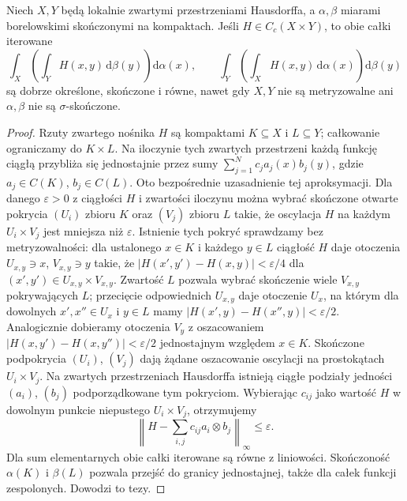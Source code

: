 \begin{lemat}
\label{lem:haar-fubini-compact-23}
Niech $X,Y$ będą lokalnie zwartymi przestrzeniami Hausdorffa,
a $\alpha,\beta$ miarami borelowskimi skończonymi na
kompaktach. Jeśli $H\in C_c(X\times Y)$, to obie całki iterowane
\[
 \int_X\!\left(\int_Y H(x,y)\,\mathrm d\beta(y)\right)
 \mathrm d\alpha(x),\qquad
 \int_Y\!\left(\int_X H(x,y)\,\mathrm d\alpha(x)\right)
 \mathrm d\beta(y)
\]
są dobrze określone, skończone i równe, nawet gdy
$X,Y$ nie są metryzowalne ani $\alpha,\beta$
nie są $\sigma$-skończone.
\end{lemat}
\begin{proof}
Rzuty zwartego nośnika $H$ są kompaktami $K\subseteq X$
i $L\subseteq Y$; całkowanie ograniczamy do $K\times L$.
Na iloczynie tych zwartych przestrzeni każdą funkcję
ciągłą przybliża się jednostajnie przez sumy
$\sum_{j=1}^Nc_j a_j(x)b_j(y)$, gdzie
$a_j\in C(K)$, $b_j\in C(L)$. Oto bezpośrednie
uzasadnienie tej aproksymacji. Dla danego $\varepsilon>0$
z ciągłości $H$ i zwartości iloczynu można wybrać
skończone otwarte pokrycia $(U_i)$ zbioru $K$ oraz
$(V_j)$ zbioru $L$ takie, że oscylacja $H$ na każdym
$U_i\times V_j$ jest mniejsza niż $\varepsilon$.
Istnienie tych pokryć sprawdzamy bez metryzowalności:
dla ustalonego $x\in K$ i każdego $y\in L$ ciągłość
$H$ daje otoczenia $U_{x,y}\ni x$, $V_{x,y}\ni y$
takie, że $|H(x',y')-H(x,y)|<\varepsilon/4$
dla $(x',y')\in U_{x,y}\times V_{x,y}$.
Zwartość $L$ pozwala wybrać skończenie wiele
$V_{x,y}$ pokrywających $L$; przecięcie
odpowiednich $U_{x,y}$ daje otoczenie $U_x$,
na którym dla dowolnych $x',x''\in U_x$ i $y\in L$
mamy $|H(x',y)-H(x'',y)|<\varepsilon/2$.
Analogicznie dobieramy otoczenia $V_y$ z oszacowaniem
$|H(x,y')-H(x,y'')|<\varepsilon/2$ jednostajnym
względem $x\in K$. Skończone podpokrycia
$(U_i)$, $(V_j)$ dają żądane oszacowanie oscylacji
na prostokątach $U_i\times V_j$.
Na zwartych przestrzeniach
Hausdorffa istnieją ciągłe podziały jedności
$(a_i)$, $(b_j)$ podporządkowane tym pokryciom.
Wybierając $c_{ij}$ jako wartość $H$ w dowolnym
punkcie niepustego $U_i\times V_j$, otrzymujemy
\[
 \left\|H-\sum_{i,j}c_{ij}a_i\otimes b_j\right\|_\infty
 \le\varepsilon.
\]
Dla sum elementarnych obie całki iterowane są równe
z liniowości. Skończoność $\alpha(K)$ i $\beta(L)$
pozwala przejść do granicy jednostajnej, także dla
całek funkcji zespolonych. Dowodzi to tezy.
\end{proof}

